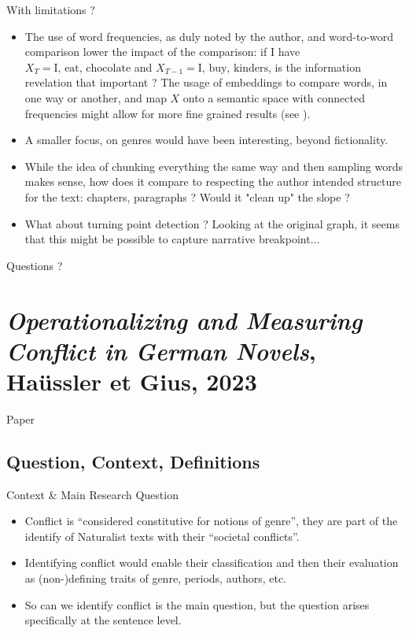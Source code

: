 \documentclass[aspectratio=169]{beamer}
\begin{document}
\begin{frame}{With limitations ?}
    \begin{itemize}
        \item The use of word frequencies, as duly noted by the author, and word-to-word comparison lower the impact of the comparison: if I have $X_{T} = \text{I, eat, chocolate}$ and $X_{T-1} = \text{I, buy, kinders}$, is the information revelation that important ? The usage of embeddings to compare words, in one way or another, and map $X$ onto a semantic space with connected frequencies might allow for more fine grained results (see \cite{eder2022boostingwordfrequenciesauthorship}).
        \item A smaller focus, on genres would have been interesting, beyond fictionality.
        \item While the idea of chunking everything the same way and then sampling words makes sense, how does it compare to respecting the author intended structure for the text: chapters, paragraphs ? Would it "clean up" the slope ?
        \item What about turning point detection ? Looking at the original graph, it seems that this might be possible to capture narrative breakpoint...
    \end{itemize}
\end{frame}

\begin{frame}{Questions ?}
    
\end{frame}

\section{\textit{Operationalizing and Measuring Conflict in German Novels}, Haüssler et Gius, 2023}


\begin{frame}{Paper}
\end{frame}

\subsection{Question, Context, Definitions}

\begin{frame}{Context \& Main Research Question}
    \begin{itemize}
        \item Conflict is ``considered constitutive for notions of genre'', they are part of the identify of Naturalist texts with their ``societal conflicts''.
        \item Identifying conflict would enable their classification and then their evaluation as (non-)defining traits of genre, periods, authors, etc.
        \item So can we identify conflict is the main question, but the question arises specifically at the sentence level.
    \end{itemize}
\end{frame}
\end{document}
